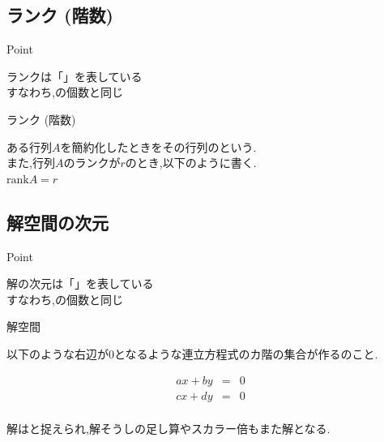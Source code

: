 \documentclass[a4paper]{jsarticle}
\begin{document}
\subsection{ランク (階数)}
\begin{itembox}[l]{Point}
    \begin{center}
        ランクは「」を表している\\
        すなわち,の個数と同じ
    \end{center}
\end{itembox}
\begin{itembox}[l]{ランク (階数)}
    \begin{center}
        ある行列$A$を簡約化したときをその行列のという.\\
        また,行列$A$のランクが$r$のとき,以下のように書く.\\
        $\mathrm{rank}A=r$\\
    \end{center}
\end{itembox}
\subsection{解空間の次元}
\begin{itembox}[l]{Point}
    \begin{center}
        解の次元は「」を表している\\
        すなわち,の個数と同じ
    \end{center}
\end{itembox}
\begin{itembox}[l]{解空間}
    \begin{center}
        以下のような右辺が$0$となるような連立方程式のカ階の集合が作るのこと.
    \end{center}
    \begin{eqnarray*}
        ax+by&=&0\\
        cx+dy&=&0\\
    \end{eqnarray*}
    \begin{center}
        解はと捉えられ,解そうしの足し算やスカラー倍もまた解となる.
    \end{center}
\end{itembox}
\end{document}
